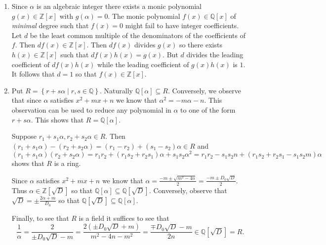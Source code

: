 \documentclass[12pt]{article}
\begin{document}
\begin{enumerate}
\item %
Since $\alpha$ is an algebraic integer there exists
a monic polynomial $g\left(x\right)\in\mathbb{Z}\left[x\right]$
with $g\left(\alpha\right)=0$.
The monic polynomial $f\left(x\right)\in\mathbb{Q}\left[x\right]$
of {\em minimal} degree such that $f\left(x\right)=0$ might fail to
have integer coefficients. Let $d$ be the least common multiple
of the denominators of the coefficients of $f$. Then
$df\left(x\right)\in\mathbb{Z}\left[x\right]$.
Then $df\left(x\right)$ divides $g\left(x\right)$
so there exists $h\left(x\right)\in\mathbb{Z}\left[x\right]$
such that $df\left(x\right)h\left(x\right)=g\left(x\right)$.
But $d$ divides the leading coefficient of $df\left(x\right)h\left(x\right)$
while the leading coefficient of $g\left(x\right)h\left(x\right)$
is $1$. It follows that $d=1$ so that
$f\left(x\right)\in\mathbb{Z}\left[x\right]$.

\item %
Put $R=\left\{r+s\alpha\mid r,s\in\mathbb{Q}\right\}$.
Naturally $\mathbb{Q}\left[\alpha\right]\subseteq R$.
Conversely, we observe
that since $\alpha$ satisfies $x^2+mx+n$ we know that
$\alpha^2=-m\alpha-n$. This observation can be used to reduce
any polynomial in $\alpha$ to one of the form $r+s\alpha$.
This shows that $R=\mathbb{Q}\left[\alpha\right]$.

Suppose $r_1+s_1\alpha,r_2+s_2\alpha\in R$.
Then $\left(r_1+s_1\alpha\right)-\left(r_2+s_2\alpha\right)
=\left(r_1-r_2\right)+\left(s_1-s_2\right)\alpha\in R$ and
\[\left(r_1+s_1\alpha\right)\left(r_2+s_2\alpha\right)
=r_1r_2+\left(r_1s_2+r_2s_1\right)\alpha+s_1s_2\alpha^2
=r_1r_2-s_1s_2n+\left(r_1s_2+r_2s_1-s_1s_2m\right)\alpha\]
shows that $R$ is a ring.

Since $\alpha$ satisfies $x^2+mx+n$ we know that
$\alpha=\frac{-m\pm\sqrt{m^2-4n}}{2}=\frac{-m\pm D_0\sqrt{D}}{2}$.
Thus $\alpha\in\mathbb{Z}\left[\sqrt{D}\right]$ so that
$\mathbb{Q}\left[\alpha\right]\subseteq\mathbb{Q}\left[\sqrt{D}\right]$.
Conversely, observe that $\sqrt{D}=\pm\frac{2\alpha+m}{D_0}$ so that
$\mathbb{Q}\left[\sqrt{D}\right]\subseteq\mathbb{Q}\left[\alpha\right]$.

Finally, to see that $R$ is a field it suffices to see that
\[\frac{1}{\alpha}=\frac{2}{\pm D_0\sqrt{D}-m}
=\frac{2\left(\pm D_0\sqrt{D}+m\right)}{m^2-4n-m^2}
=\frac{\mp D_0\sqrt{D}-m}{2n}
\in\mathbb{Q}\left[\sqrt{D}\right]=R.\]


\end{enumerate}
\end{document}
